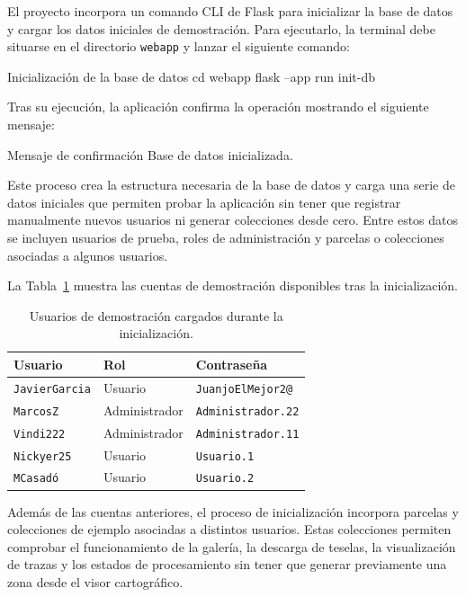 El proyecto incorpora un comando CLI de Flask para inicializar la base de datos y cargar los datos iniciales de demostración. Para ejecutarlo, la terminal debe situarse en el directorio \texttt{webapp} y lanzar el siguiente comando:

\begin{pythonbox}{Inicialización de la base de datos}
cd webapp
flask --app run init-db
\end{pythonbox}

Tras su ejecución, la aplicación confirma la operación mostrando el siguiente mensaje:

\begin{infocmdbox}{Mensaje de confirmación}
Base de datos inicializada.
\end{infocmdbox}

Este proceso crea la estructura necesaria de la base de datos y carga una serie de datos iniciales que permiten probar la aplicación sin tener que registrar manualmente nuevos usuarios ni generar colecciones desde cero. Entre estos datos se incluyen usuarios de prueba, roles de administración y parcelas o colecciones asociadas a algunos usuarios.

La Tabla~\ref{tab:usuarios_demostracion} muestra las cuentas de demostración disponibles tras la inicialización.

\begin{table}[]
	\centering
	\small
	\renewcommand{\arraystretch}{1.25}
	\begin{tabular}{p{4cm} p{3cm} p{5cm}}
		\toprule
		\textbf{Usuario} & \textbf{Rol} & \textbf{Contraseña} \\
		\midrule
		\texttt{JavierGarcia} & Usuario &
		\texttt{JuanjoElMejor2@} \\
		\texttt{MarcosZ} & Administrador &
		\texttt{Administrador.22} \\
		\texttt{Vindi222} & Administrador &
		\texttt{Administrador.11} \\
		\texttt{Nickyer25} & Usuario &
		\texttt{Usuario.1} \\
		\texttt{MCasadó} & Usuario &
		\texttt{Usuario.2} \\
		\bottomrule
	\end{tabular}
	\caption{Usuarios de demostración cargados durante la inicialización.}
	\label{tab:usuarios_demostracion}
\end{table}

Además de las cuentas anteriores, el proceso de inicialización incorpora parcelas y colecciones de ejemplo asociadas a distintos usuarios. Estas colecciones permiten comprobar el funcionamiento de la galería, la descarga de teselas, la visualización de trazas y los estados de procesamiento sin tener que generar previamente una zona desde el visor cartográfico.


